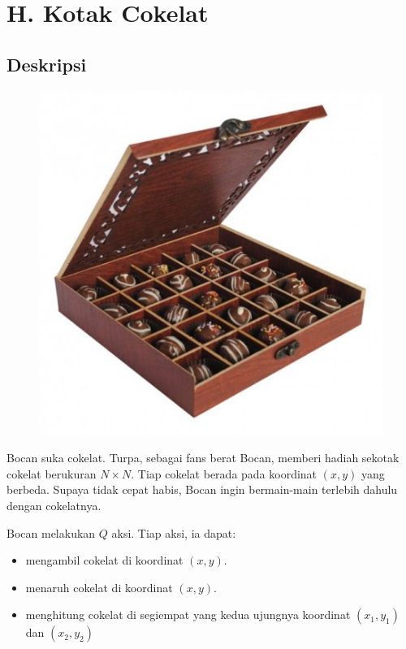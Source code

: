 \documentclass{article}
\begin{document}
\section*{\hfil H. Kotak Cokelat\hfil}


\subsection*{Deskripsi}

\begin{figure}[h!]
	\centering
	\includegraphics[width=0.5\linewidth]{box-of-chocolate}
\end{figure}

\par\noindent Bocan suka cokelat. Turpa, sebagai fans berat Bocan, memberi hadiah sekotak cokelat berukuran $N \times N$. Tiap cokelat berada pada koordinat $(x,y)$ yang berbeda. Supaya tidak cepat habis, Bocan ingin bermain-main terlebih dahulu dengan cokelatnya.

\par\noindent Bocan melakukan $Q$ aksi. Tiap aksi, ia dapat:

\begin{itemize}
	\item mengambil cokelat di koordinat $(x,y)$.
	\item menaruh cokelat di koordinat $(x,y)$.
	\item menghitung cokelat di segiempat yang kedua ujungnya koordinat $(x_1,y_1)$ dan $(x_2,y_2)$
\end{itemize}
\end{document}
